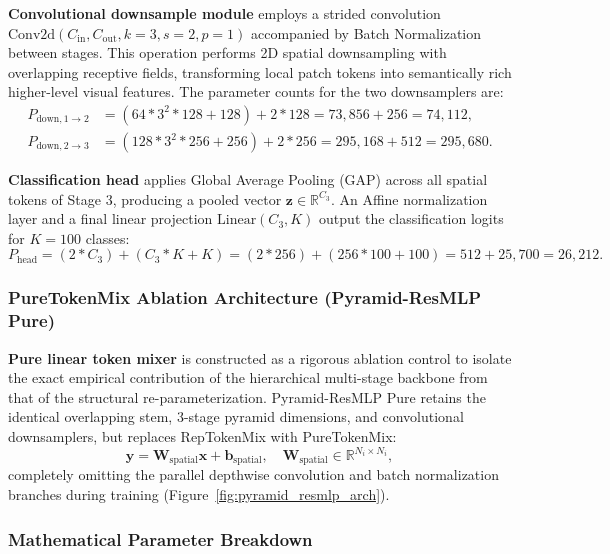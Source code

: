 \textbf{Convolutional downsample module} employs a strided convolution $\text{Conv2d}(C_{\text{in}}, C_{\text{out}}, k=3, s=2, p=1)$ accompanied by Batch Normalization between stages. This operation performs 2D spatial downsampling with overlapping receptive fields, transforming local patch tokens into semantically rich higher-level visual features. The parameter counts for the two downsamplers are:
\begin{align}
P_{\text{down}, 1\rightarrow2} &= (64 * 3^2 * 128 + 128) + 2 * 128 = 73,856 + 256 = 74,112, \\
P_{\text{down}, 2\rightarrow3} &= (128 * 3^2 * 256 + 256) + 2 * 256 = 295,168 + 512 = 295,680.
\end{align}

\textbf{Classification head} applies Global Average Pooling (GAP) across all spatial tokens of Stage 3, producing a pooled vector $\mathbf{z} \in \mathbb{R}^{C_3}$. An Affine normalization layer and a final linear projection $\text{Linear}(C_3, K)$ output the classification logits for $K=100$ classes:
\begin{equation}
P_{\text{head}} = (2 * C_3) + (C_3 * K + K) = (2 * 256) + (256 * 100 + 100) = 512 + 25,700 = 26,212.
\end{equation}

\subsubsection{PureTokenMix Ablation Architecture (Pyramid-ResMLP Pure)}
\label{subsubsection:pure_ablation}

\textbf{Pure linear token mixer} is constructed as a rigorous ablation control to isolate the exact empirical contribution of the hierarchical multi-stage backbone from that of the structural re-parameterization. Pyramid-ResMLP Pure retains the identical overlapping stem, 3-stage pyramid dimensions, and convolutional downsamplers, but replaces RepTokenMix with PureTokenMix:
\begin{equation}
\mathbf{y} = \mathbf{W}_{\text{spatial}} \mathbf{x} + \mathbf{b}_{\text{spatial}}, \quad \mathbf{W}_{\text{spatial}} \in \mathbb{R}^{N_i \times N_i},
\end{equation}
completely omitting the parallel depthwise convolution and batch normalization branches during training (Figure~\ref{fig:pyramid_resmlp_arch}).

\subsubsection{Mathematical Parameter Breakdown}
\label{subsubsection:pyramid_params}

